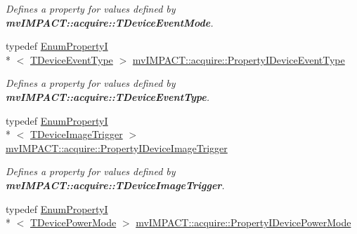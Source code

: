 \begin{DoxyCompactItemize}
\begin{DoxyCompactList}\small\item\em Defines a property for values defined by {\bfseries mv\+I\+M\+P\+A\+C\+T\+::acquire\+::\+T\+Device\+Event\+Mode}. \end{DoxyCompactList}\item 
\hypertarget{group___device_specific_interface_ga015a49062ba10316202f202c53d32993}{typedef \hyperlink{classmv_i_m_p_a_c_t_1_1acquire_1_1_enum_property_i}{Enum\+Property\+I}\\*
$<$ \hyperlink{group___common_interface_ga0947eb7d6a73b9baab283cbf65cd8d6b}{T\+Device\+Event\+Type} $>$ \hyperlink{group___device_specific_interface_ga015a49062ba10316202f202c53d32993}{mv\+I\+M\+P\+A\+C\+T\+::acquire\+::\+Property\+I\+Device\+Event\+Type}}\label{group___device_specific_interface_ga015a49062ba10316202f202c53d32993}

\begin{DoxyCompactList}\small\item\em Defines a property for values defined by {\bfseries mv\+I\+M\+P\+A\+C\+T\+::acquire\+::\+T\+Device\+Event\+Type}. \end{DoxyCompactList}\item 
\hypertarget{group___device_specific_interface_ga0a157bd269e0e43d0d944d3f9615f770}{typedef \hyperlink{classmv_i_m_p_a_c_t_1_1acquire_1_1_enum_property_i}{Enum\+Property\+I}\\*
$<$ \hyperlink{group___device_specific_interface_ga84cf0914a0520d38dac38d96d5bc9754}{T\+Device\+Image\+Trigger} $>$ \hyperlink{group___device_specific_interface_ga0a157bd269e0e43d0d944d3f9615f770}{mv\+I\+M\+P\+A\+C\+T\+::acquire\+::\+Property\+I\+Device\+Image\+Trigger}}\label{group___device_specific_interface_ga0a157bd269e0e43d0d944d3f9615f770}

\begin{DoxyCompactList}\small\item\em Defines a property for values defined by {\bfseries mv\+I\+M\+P\+A\+C\+T\+::acquire\+::\+T\+Device\+Image\+Trigger}. \end{DoxyCompactList}\item 
\hypertarget{group___device_specific_interface_ga82621bec575e1885ef8589f5ebfdc43d}{typedef \hyperlink{classmv_i_m_p_a_c_t_1_1acquire_1_1_enum_property_i}{Enum\+Property\+I}\\*
$<$ \hyperlink{group___device_specific_interface_ga49794dba4ca888981afe17cdb43d427d}{T\+Device\+Power\+Mode} $>$ \hyperlink{group___device_specific_interface_ga82621bec575e1885ef8589f5ebfdc43d}{mv\+I\+M\+P\+A\+C\+T\+::acquire\+::\+Property\+I\+Device\+Power\+Mode}}\label{group___device_specific_interface_ga82621bec575e1885ef8589f5ebfdc43d}


\end{DoxyCompactItemize}
